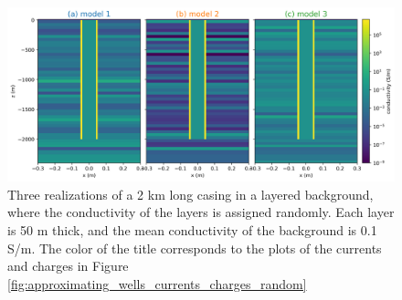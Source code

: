 \begin{figure}
    \begin{center}
    \includegraphics[width=\textwidth]{figures/random_layers.png}
    \end{center}
\caption{
    Three realizations of a 2 km long casing in a layered background, where the conductivity of the
    layers is assigned randomly. Each layer is 50 m thick, and the mean conductivity of the background
    is 0.1 S/m. The color of the title corresponds to the plots of the currents and charges in Figure
    \ref{fig:approximating_wells_currents_charges_random}
}
\label{fig:random_layers}
\end{figure}
